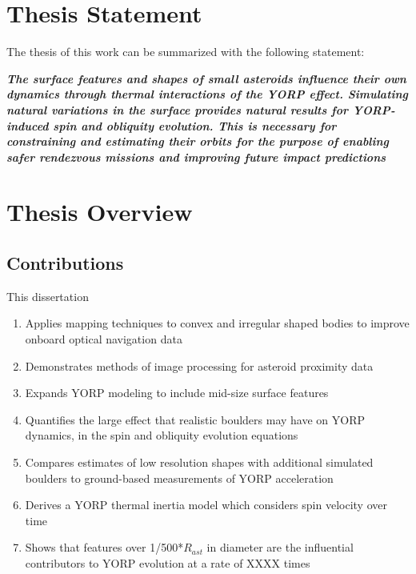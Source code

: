 \section{Thesis Statement}
The thesis of this work can be summarized with the following statement:

\begin{center}
\textbf{\it{The surface features and shapes of small asteroids influence their own dynamics through thermal interactions of the YORP effect. Simulating natural variations in the surface provides natural results for YORP-induced spin and obliquity evolution. This is necessary for constraining and estimating their orbits for the purpose of enabling safer rendezvous missions and improving future impact predictions}}
\end{center}

\section{Thesis Overview}
\subsection{Contributions}
This dissertation
\begin{enumerate}
    \item Applies mapping techniques to convex and irregular shaped bodies to improve onboard optical navigation data
    \item Demonstrates methods of image processing for asteroid proximity data
    \item Expands YORP modeling to include mid-size surface features
    \item Quantifies the large effect that realistic boulders may have on YORP dynamics, in the spin and obliquity evolution equations
    \item Compares estimates of low resolution shapes with additional simulated boulders to ground-based measurements of YORP acceleration
    \item Derives a YORP thermal inertia model which considers spin velocity over time
    \item Shows that features over 1/500*$R_{ast}$ in diameter are the influential contributors to YORP evolution at a rate of XXXX times 
\end{enumerate}


























